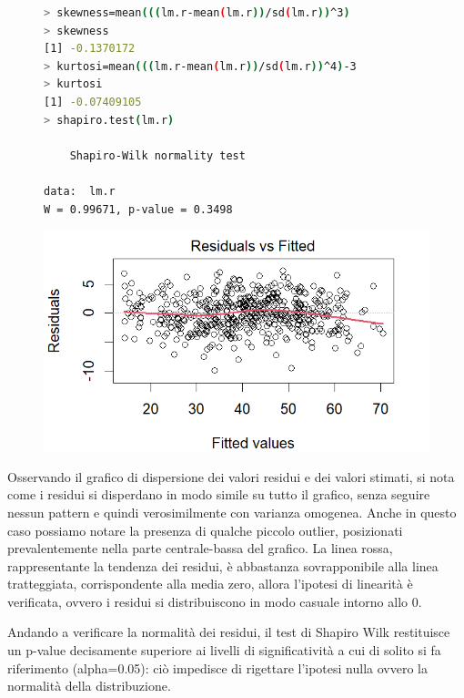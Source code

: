 \documentclass[11pt,a4paper]{article}
\begin{document}
\begin{figure}[h]
    \hspace{-2.00cm}
    \begin{minipage}{.6\textwidth} 
    	\begin{lstlisting}[language=bash,basicstyle=\tiny,tabsize=2,frame = single]
> skewness=mean(((lm.r-mean(lm.r))/sd(lm.r))^3)
> skewness
[1] -0.1370172
> kurtosi=mean(((lm.r-mean(lm.r))/sd(lm.r))^4)-3
> kurtosi
[1] -0.07409105
> shapiro.test(lm.r)
        
	Shapiro-Wilk normality test
        
data:  lm.r
W = 0.99671, p-value = 0.3498
        \end{lstlisting}
    \end{minipage}
    \hspace{0.07\textwidth}%
    \begin{minipage}{0.5\textwidth} 
    	\includegraphics[scale=.45]{imgs/residuals_linear_model.png}
    \end{minipage}
\end{figure}
Osservando il grafico di dispersione dei valori residui e dei valori stimati, si nota come i residui si disperdano in modo simile su tutto il grafico, senza seguire nessun pattern e quindi verosimilmente con varianza omogenea. Anche in questo caso possiamo notare la presenza di qualche piccolo outlier, posizionati prevalentemente nella parte centrale-bassa del grafico. La linea rossa, rappresentante la tendenza dei residui, è abbastanza sovrapponibile alla linea tratteggiata, corrispondente alla media zero, allora l’ipotesi di linearità è verificata, ovvero i residui si distribuiscono in modo casuale intorno allo 0.

Andando a verificare la normalità dei residui, il test di Shapiro Wilk restituisce un p-value decisamente superiore ai livelli di significatività a cui di solito si fa riferimento (alpha=0.05): ciò impedisce di rigettare l'ipotesi nulla ovvero la normalità della distribuzione.
\end{document}
